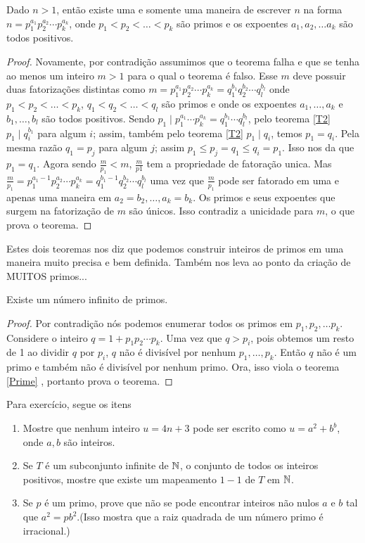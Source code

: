 \begin{theorem}
    Dado $n > 1$, então existe uma e somente uma maneira de escrever $n$ na forma $n= p^{a_{1}}_{1}p^{a_{2}}_{2}\cdots p^{a_{k}}_{k}$, onde $p_{1} < p_{2} < \ldots < p_{k}$ são primos e os expoentes $a_{1}, a_{2},\ldots a_{k}$ são todos positivos.
    \begin{proof}
        Novamente, por contradição assumimos que o teorema falha e que se tenha ao menos um inteiro $m>1$ para o qual o teorema é falso. Esse $m$ deve possuir duas fatorizações distintas como $m=p^{a_{1}}_{1}p^{a_{2}}_{2}\cdots p^{a_{k}}_{k} = q^{b_{1}}_{1}q^{b_{2}}_{2}\cdots q^{b_{l}}_{l}$ onde $p_{1} < p_{2} < \ldots < p_{k}$, $q_{1} < q_{2} < \ldots < q_{l}$ são primos e onde os expoentes $a_{1}, \ldots , a_{k}$ e $b_{1},\ldots , b_{l}$ são todos positivos. Sendo $p_{1}\mid p^{a_{1}}_{1}\cdots p^{a_{k}}_{k} = q^{b_{1}}_{1}\cdots q^{b_{l}}_{l}$, pelo teorema \ref{T2} $p_{1}\mid q^{b_{1}}_{i}$ para algum $i$; assim, também pelo teorema \ref{T2} $p_{1}\mid q_{i}$, temos $p_{1} = q_{i}$. Pela mesma razão $q_{1} = p_{j}$ para algum $j$; assim $p_{1}\leq p_{j} = q_{1} \leq q_{i} = p_{1}$. Isso nos da que $p_{1} = q_{1}$. Agora sendo $\tfrac{m}{p_{1}} < m$, $\tfrac{m}{p{1}}$ tem a propriedade de fatoração unica. Mas $\tfrac{m}{p_{1}} = p^{a_{1}-1}_{1}p^{a_{2}}_{2}\cdots p^{a_{k}}_{k} = q^{b_{1}-1}_{1}q^{b_{2}}_{2}\cdots q^{b_{l}}_{l}$ uma vez que $\tfrac{m}{p_{1}}$ pode ser fatorado em uma e apenas uma maneira em $a_{2}=b_{2},\ldots , a_{k} = b_{k}$. Os primos e seus expoentes que surgem na fatorização de $m$ são únicos. Isso contradiz a unicidade para $m$, o que prova o teorema.
    \end{proof}
\end{theorem}
Estes dois teoremas nos diz que podemos construir inteiros de primos em uma maneira muito precisa e bem definida. Também nos leva ao ponto da criação de MUITOS primos...
\begin{theorem}
    Existe um número infinito de primos.
    \begin{proof}
        Por contradição nós podemos enumerar todos os primos em $p_{1},p_{2},\ldots p_{k}$. Considere o inteiro $q=1+p_{1}p_{2}\cdots p_{k}.$ Uma vez que $q>p_{i}$, pois obtemos um resto de 1 ao dividir $q$ por $p_{i}$, $q$ não é divisível por nenhum $p_{1},\ldots , p_{k}$. Então $q$ não é um primo e também não é divisível por nenhum primo. Ora, isso viola o teorema \ref{Prime} , portanto prova o teorema.
    \end{proof}
\end{theorem}
Para exercício, segue os itens
\begin{enumerate}
    \item Mostre que nenhum inteiro $u=4n + 3$ pode ser escrito como $u=a^{2} + b^{b}$, onde $a,b$ são inteiros.
    \item Se $T$ é um subconjunto infinite de $\mathbb{N}$, o conjunto de todos os inteiros positivos, mostre que existe um mapeamento $1-1$ de $T$ em $\mathbb{N}$.
    \item Se $p$ é um primo, prove que não se pode encontrar inteiros não nulos $a$ e $b$ tal que $a^{2} = pb^{2}$.(Isso mostra que a raiz quadrada de um número primo é irracional.)
\end{enumerate}
